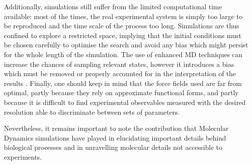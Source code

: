 \documentclass[graybox]{svmult}
\begin{document}
Additionally, simulations still suffer from the limited computational time available: most of the times, the real experimental system is simply too large to be reproduced and the time scale of the process too long. Simulations are thus confined to explore a restricted space, implying that the initial conditions must be chosen carefully to optimise the search and avoid any bias which might persist for the whole length of the simulation. The use of enhanced MD techniques can increase the chances of sampling relevant states, however it introduces a bias which must be removed or properly accounted for in the interpretation of the results \cite{Bernardi2015,Best2005,Barducci2010,Barducci2011,Mills2008}.
Finally, one should keep in mind that the force fields used are far from optimal, partly because they rely on approximate functional forms, and partly because it is difficult to find experimental observables measured with the desired resolution able to discriminate between sets of parameters.

Nevertheless, it remains important to note the contribution that Molecular Dynamics simulations have played in elucidating important details behind biological processes and in unravelling molecular details not accessible to experiments.

%


%
\end{document}
